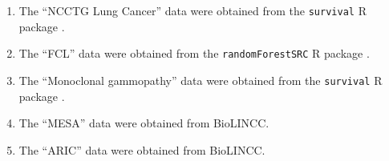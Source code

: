 \documentclass{article}\usepackage[]{graphicx}\usepackage[]{xcolor}
\begin{document}
\begin{enumerate}
 \item[] The ``NCCTG Lung Cancer'' data \citep{loprinzi1994prospective} were obtained from the \texttt{survival} R package \citep{survival}. 
 \item[] The ``FCL'' data \citep{pintilie2006competing} were obtained from the \texttt{randomForestSRC} R package \citep{randomForestSRC}. 
 \item[] The ``Monoclonal gammopathy'' data \citep{kyle2002long} were obtained from the \texttt{survival} R package \citep{survival}. 
 \item[] The ``MESA'' data \citep{bild2002multi} were obtained from BioLINCC. 
 \item[] The ``ARIC'' data \citep{aric1989atherosclerosis} were obtained from BioLINCC.

\end{enumerate}
\end{document}
